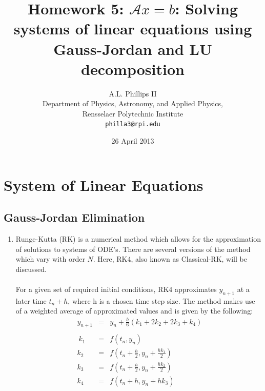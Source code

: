 \documentclass{report}
\begin{document}
\title{\textbf{Homework 5:} $\mathcal{A}x=b$: Solving systems of linear equations using Gauss-Jordan and LU decomposition}
\author{A.L. Phillips II\\
  Department of Physics, Astronomy, and Applied Physics,\\
  Rensselaer Polytechnic Institute\\
  \texttt{philla3@rpi.edu}}
 \date{26 April 2013}
 \renewcommand{\chaptername}{Assignment}
 \setcounter {chapter}{4}
\maketitle

\chapter{System of Linear Equations}

\section{Gauss-Jordan Elimination}
\begin{enumerate}

\item Runge-Kutta (RK) is a numerical method which allows for the approximation of solutions to systems of ODE's.  There are several versions of the method which vary with order $N$. Here, RK4, also known as Classical-RK, will be discussed. 
\\
\\For a given set of required initial conditions, RK4 approximates $ y_{n+1} $ at a later time $ t_n+h$, where h is a chosen time step size. The method makes use of a weighted average of approximated values and is given by the following:
\\
\begin{eqnarray*}
\ y_{n+1}&=&y_n+\frac{h}{6}(k_1+2k_2+2k_3+k_4)\\
\\\
\ k_1 &=& f(t_n,y_n)\\
\ k_2 &=& f(t_n+\frac{h}{2}, y_n+\frac{hk_1}{2})\\
\ k_3 &=& f(t_n+\frac{h}{2}, y_n+\frac{hk_2}{2}) \\
\ k_4 &=& f(t_n+h, y_n+hk_3) \\ \\
\end{eqnarray*}

\end{enumerate}
\end{document}

